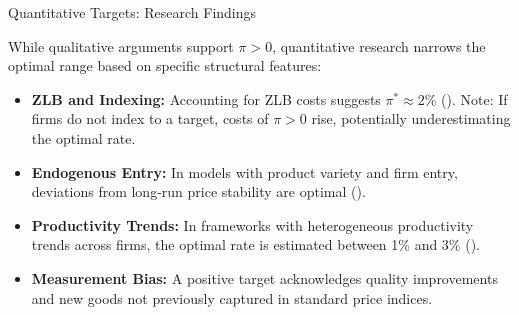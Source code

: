 \documentclass[11pt,aspectratio=169]{beamer}
\begin{document}
\begin{frame}{Quantitative Targets: Research Findings}
\small

While qualitative arguments support $\pi > 0$, quantitative research narrows the optimal range based on specific structural features:

\vspace{0.3cm}

\begin{itemize}
    \item \textbf{ZLB and Indexing:} Accounting for ZLB costs suggests $\pi^* \approx 2\%$ (\cite{coibion2012}). Note: If firms do not index to a target, costs of $\pi > 0$ rise, potentially underestimating the optimal rate.
    
    \vspace{0.2cm}
    
    \item \textbf{Endogenous Entry:} In models with product variety and firm entry, deviations from long-run price stability are optimal (\cite{bilbie2014}).
    
    \vspace{0.2cm}
    
    \item \textbf{Productivity Trends:} In frameworks with heterogeneous productivity trends across firms, the optimal rate is estimated between 1\% and 3\% (\cite{adam2019}).
    
    \vspace{0.2cm}
    
    \item \textbf{Measurement Bias:} A positive target acknowledges quality improvements and new goods not previously captured in standard price indices.
\end{itemize}

\end{frame}
\end{document}

